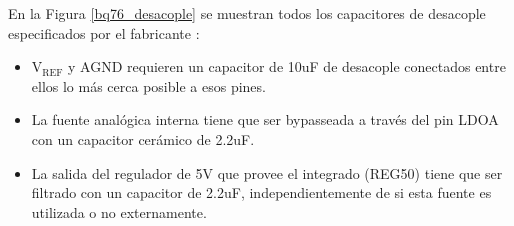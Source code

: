 \documentclass[10pt, a4paper]{article}
\begin{document}
En la Figura \ref{bq76_desacople} se muestran todos los capacitores de desacople
especificados por el fabricante \cite{BQ76PL536A}:
\begin{itemize}
    \item $\mathrm{V_{REF}}$ y AGND requieren un capacitor de 10uF de
        desacople conectados entre ellos lo m\'as cerca posible a esos pines.
    \item La fuente anal\'ogica interna tiene que ser bypasseada a trav\'es del
        pin LDOA con un capacitor cer\'amico de 2.2uF.
    \item La salida del regulador de 5V que provee el integrado (REG50) tiene 
        que ser filtrado con un capacitor de 2.2uF, independientemente de si 
        esta fuente es utilizada o no externamente.
\end{itemize}
\end{document}
